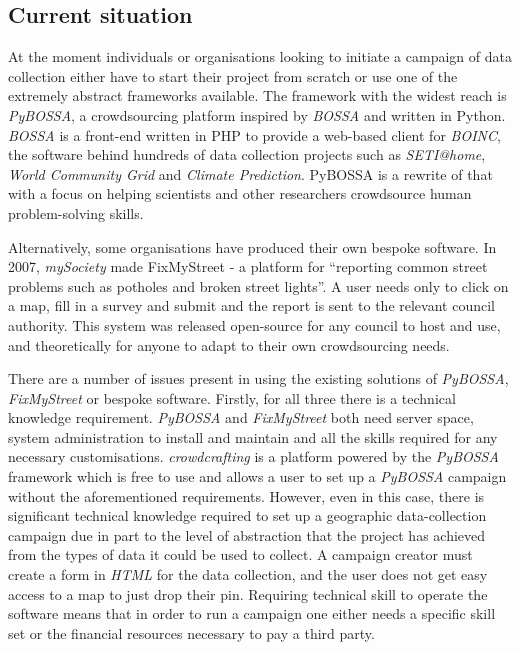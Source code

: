 \documentclass{article}
\begin{document}
		\subsection{Current situation}
		At the moment individuals or organisations looking to initiate a campaign of data collection either have to start their project from scratch or use one of the extremely abstract frameworks available. The framework with the widest reach is \emph{PyBOSSA}, a crowdsourcing platform inspired by \emph{BOSSA} and written in Python. \emph{BOSSA} is a front-end written in PHP to provide a web-based client for \emph{BOINC}, the software behind hundreds of data collection projects such as \emph{SETI@home}, \emph{World Community Grid} and \emph{Climate Prediction}\cite{_boinc_2015}. PyBOSSA is a rewrite of that with a focus on helping scientists and other researchers crowdsource human problem-solving skills.

		Alternatively, some organisations have produced their own bespoke software. In 2007, \emph{mySociety} made FixMyStreet - a platform for ``reporting common street problems such as potholes and broken street lights''\cite{_mysociety/fixmystreet_2015}. A user needs only to click on a map, fill in a survey and submit and the report is sent to the relevant council authority. This system was released open-source for any council to host and use, and theoretically for anyone to adapt to their own crowdsourcing needs.

		There are a number of issues present in using the existing solutions of \emph{PyBOSSA}, \emph{FixMyStreet} or bespoke software. Firstly, for all three there is a technical knowledge requirement. \emph{PyBOSSA} and \emph{FixMyStreet} both need server space, system administration to install and maintain and all the skills required for any necessary customisations. \emph{crowdcrafting} is a platform powered by the \emph{PyBOSSA} framework which is free to use and allows a user to set up a \emph{PyBOSSA} campaign without the aforementioned requirements. However, even in this case, there is significant technical knowledge required to set up a geographic data-collection campaign due in part to the level of abstraction that the project has achieved from the types of data it could be used to collect. A campaign creator must create a form in \emph{HTML} for the data collection, and the user does not get easy access to a map to just drop their pin. Requiring technical skill to operate the software means that in order to run a campaign one either needs a specific skill set or the financial resources necessary to pay a third party.
\end{document}
